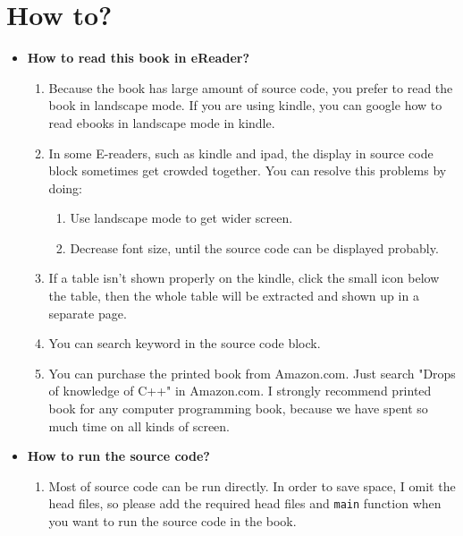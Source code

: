 \documentclass[a4paper,11pt,twoside]{book}
\begin{document}
\chapter*{How to?}
\begin{itemize}
	\item \textbf{How to read this book in eReader?}
	\begin{enumerate}
		\item Because the book has large amount of source code, you prefer to read the book in landscape mode. If you are using kindle, you can google how to read ebooks in landscape mode in kindle. 
		
		\item In some E-readers, such as kindle and ipad, the display in source code block sometimes get crowded together. You can resolve this problems by doing:
		\begin{enumerate}
			\item Use landscape mode to get wider screen.
			\item Decrease font size, until the source code can be displayed probably.
		\end{enumerate}
		
		\item If a table isn't shown properly on the kindle, click the small icon below the table, then the whole table will be extracted and shown up in a separate page. 
		
		\item You can search keyword in the source code block.
		
		\item You can purchase the printed book from Amazon.com. Just search "Drops of knowledge of C++" in Amazon.com. I strongly recommend printed book for any computer programming book, because we have spent so much time on all kinds of screen.
		
		
	\end{enumerate}

	\item \textbf{How to run the source code?}
	\begin{enumerate}
		\item Most of source code can be run directly. In order to save space, I omit the head files, so please add the required head files and \texttt{main} function when you want to run the source code in the book.
		

\end{enumerate}
\end{itemize}
\end{document}
